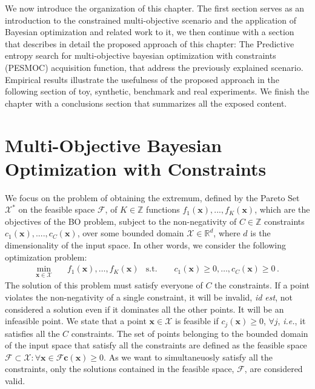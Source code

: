 We now introduce the organization of this chapter. The first section serves as an introduction to the constrained multi-objective scenario and the application of Bayesian optimization and related work to it, we then continue with a section that describes in detail the proposed approach of this chapter: The Predictive entropy search for multi-objective bayesian optimization with constraints (PESMOC) acquisition function, that address the previously explained scenario. Empirical results illustrate the usefulness of the proposed approach in the following section of toy, synthetic, benchmark and real experiments. We finish the chapter with a conclusions section that summarizes all the exposed content.

\section{Multi-Objective Bayesian Optimization with Constraints}

We focus on the problem of obtaining the extremum, defined by the Pareto Set $\mathcal{X}^*$ on the feasible space $\mathcal{F}$, of $K \in \mathbb{Z}$ functions $f_1(\mathbf{x}),...,f_K(\mathbf{x})$, which are the objectives of the BO problem, subject to the non-negativity of $C \in \mathbb{Z}$ constraints $c_1(\textbf{x}),....,c_C(\textbf{x})$, over some bounded domain $\mathcal{X} \in \mathds{R}^d$, where $d$ is the dimensionality of the input space. In other words, we consider the following optimization problem:
\begin{align}
\underset{\mathbf{x} \in \mathcal{X}}{\text{min}} & \quad f_1(\mathbf{x}), \ldots, f_K(\mathbf{x}) & 
\text{s.t.} \quad \quad c_1(\mathbf{x}) \geq 0, \ldots, c_C(\mathbf{x}) \geq 0\,.
\label{eq:optimization}
\end{align}
The solution of this problem must satisfy everyone of $C$ the constraints. If a point violates the non-negativity of a single constraint, it will be invalid, \textit{id est}, not considered a solution even if it dominates all the other points. It will be an infeasible point. We state that a point $\mathbf{x} \in \mathcal{X}$ is feasible if $c_j(\mathbf{x})\geq 0$, $\forall j$, \textit{i.e.}, it satisfies all the $C$ constraints. The set of points belonging to the bounded domain of the input space that satisfy all the constraints are defined as the feasible space $\mathcal{F} \subset \mathcal{X} : \forall \mathbf{x} \in \mathcal{F} \mathbf{c}(\mathbf{x}) \geq 0$. As we want to simultaneuosly satisfy all the constraints, only the solutions contained in the feasible space, $\mathcal{F}$, are considered valid.


